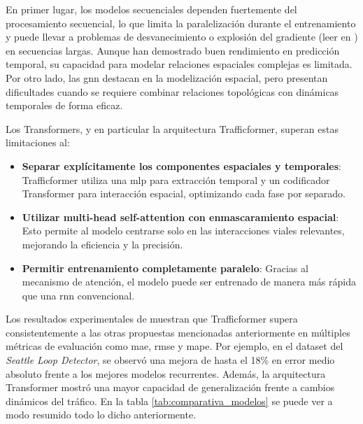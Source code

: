 En primer lugar, los modelos secuenciales dependen fuertemente del procesamiento secuencial, lo que limita la paralelización durante el entrenamiento y puede llevar a problemas de desvanecimiento o explosión del gradiente (leer en \cite{desvGradiente}) en secuencias largas. Aunque han demostrado buen rendimiento en predicción temporal, su capacidad para modelar relaciones espaciales complejas es limitada. Por otro lado, las \acrshort{gnn} destacan en la modelización espacial, pero presentan dificultades cuando se requiere combinar relaciones topológicas con dinámicas temporales de forma eficaz.

Los Transformers, y en particular la arquitectura Trafficformer, superan estas limitaciones al:

\begin{itemize}
	\item \textbf{Separar explícitamente los componentes espaciales y temporales}: Trafficformer utiliza una \acrshort{mlp} para extracción temporal y un codificador Transformer para interacción espacial, optimizando cada fase por separado.
	\item \textbf{Utilizar multi-head self-attention con enmascaramiento espacial}: Esto permite al modelo centrarse solo en las interacciones viales relevantes, mejorando la eficiencia y la precisión.
	\item \textbf{Permitir entrenamiento completamente paralelo}: Gracias al mecanismo de atención, el modelo puede ser entrenado de manera más rápida que una \acrshort{rnn} convencional.
\end{itemize}

Los resultados experimentales de \cite{trafficformer} muestran que Trafficformer supera consistentemente a las otras propuestas mencionadas anteriormente en múltiples métricas de evaluación como \acrshort{mae}, \acrshort{rmse} y \acrshort{mape}. Por ejemplo, en el dataset del \textit{Seattle Loop Detector}, se observó una mejora de hasta el 18\% en error medio absoluto frente a los mejores modelos recurrentes. Además, la arquitectura Transformer mostró una mayor capacidad de generalización frente a cambios dinámicos del tráfico. En la tabla \ref{tab:comparativa_modelos} se puede ver a modo resumido todo lo dicho anteriormente.

